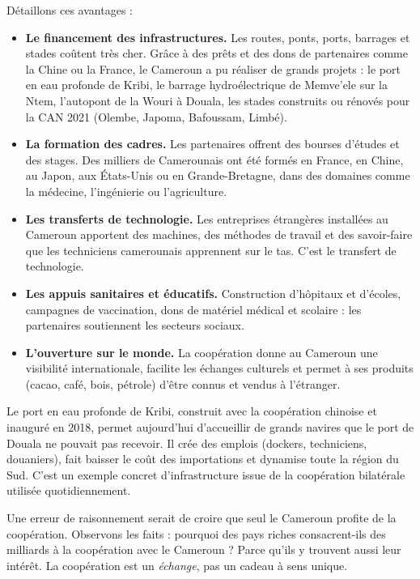 \documentclass[11pt]{article}
\newcommand{\cle}[1]{{\popxbold\color{popdark}#1}}
\newcounter{popsec}
\newcounter{popsub}
\newcommand{\courssub}[1]{%
  \stepcounter{popsub}%
  \par\vspace{9pt}\noindent{\popxbold\fontsize{11.5}{13}\selectfont\color{popink}{\color{poporange}\thepopsec.\thepopsub}\hspace{6pt}#1}\par\nopagebreak\vspace{4pt}
}
\begin{document}
Détaillons ces avantages :

\begin{itemize}
\item \textbf{Le financement des infrastructures.} Les routes, ponts, ports, barrages et stades coûtent très cher. Grâce à des prêts et des dons de partenaires comme la Chine ou la France, le Cameroun a pu réaliser de grands projets : le port en eau profonde de Kribi, le barrage hydroélectrique de Memve'ele sur la Ntem, l'autopont de la Wouri à Douala, les stades construits ou rénovés pour la CAN 2021 (Olembe, Japoma, Bafoussam, Limbé).
\item \textbf{La formation des cadres.} Les partenaires offrent des \cle{bourses d'études} et des stages. Des milliers de Camerounais ont été formés en France, en Chine, au Japon, aux États-Unis ou en Grande-Bretagne, dans des domaines comme la médecine, l'ingénierie ou l'agriculture.
\item \textbf{Les transferts de technologie.} Les entreprises étrangères installées au Cameroun apportent des machines, des méthodes de travail et des savoir-faire que les techniciens camerounais apprennent sur le tas. C'est le \cle{transfert de technologie}.
\item \textbf{Les appuis sanitaires et éducatifs.} Construction d'hôpitaux et d'écoles, campagnes de vaccination, dons de matériel médical et scolaire : les partenaires soutiennent les secteurs sociaux.
\item \textbf{L'ouverture sur le monde.} La coopération donne au Cameroun une visibilité internationale, facilite les échanges culturels et permet à ses produits (cacao, café, bois, pétrole) d'être connus et vendus à l'étranger.
\end{itemize}

\begin{exemplebox}
Le port en eau profonde de Kribi, construit avec la coopération chinoise et inauguré en 2018, permet aujourd'hui d'accueillir de grands navires que le port de Douala ne pouvait pas recevoir. Il crée des emplois (dockers, techniciens, douaniers), fait baisser le coût des importations et dynamise toute la région du Sud. C'est un exemple concret d'infrastructure issue de la coopération bilatérale utilisée quotidiennement.
\end{exemplebox}

\courssub{Les avantages pour les pays partenaires}

Une erreur de raisonnement serait de croire que seul le Cameroun profite de la coopération. Observons les faits : pourquoi des pays riches consacrent-ils des milliards à la coopération avec le Cameroun ? Parce qu'ils y trouvent aussi leur intérêt. La coopération est un \emph{échange}, pas un cadeau à sens unique.
\end{document}
